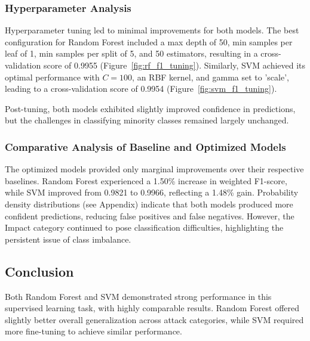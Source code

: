         \clearpage
        
            
        \subsubsection*{Hyperparameter Analysis\\}
        
            Hyperparameter tuning led to minimal improvements for both models. The best configuration for Random Forest included a max depth of 50, min samples per leaf of 1, min samples per split of 5, and 50 estimators, resulting in a cross-validation score of 0.9955 (Figure~\ref{fig:rf_f1_tuning}). Similarly, SVM achieved its optimal performance with \( C = 100 \), an RBF kernel, and gamma set to 'scale', leading to a cross-validation score of 0.9954 (Figure~\ref{fig:svm_f1_tuning}). 
            
            Post-tuning, both models exhibited slightly improved confidence in predictions, but the challenges in classifying minority classes remained largely unchanged.
            
        \subsubsection*{Comparative Analysis of Baseline and Optimized Models\\}
        
            The optimized models provided only marginal improvements over their respective baselines. Random Forest experienced a 1.50\% increase in weighted F1-score, while SVM improved from 0.9821 to 0.9966, reflecting a 1.48\% gain. Probability density distributions (see Appendix) indicate that both models produced more confident predictions, reducing false positives and false negatives. However, the Impact category continued to pose classification difficulties, highlighting the persistent issue of class imbalance.

    \subsection{Conclusion}
    
        Both Random Forest and SVM demonstrated strong performance in this supervised learning task, with highly comparable results. Random Forest offered slightly better overall generalization across attack categories, while SVM required more fine-tuning to achieve similar performance. 
            
